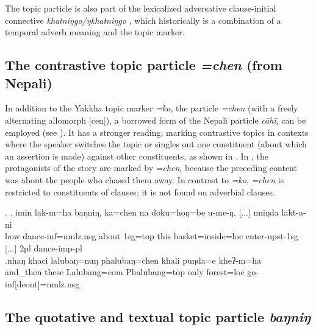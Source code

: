 The topic particle is also part of the lexicalized adversative clause-initial connective \emph{khatniŋgo/ŋkhatniŋgo} , which historically is a combination of a temporal adverb meaning  and the topic marker.

\subsection{The contrastive topic particle \emph{=chen} (from Nepali)}

In addition to the Yakkha topic marker \emph{=ko}, the particle \emph{=chen} (with a freely alternating allomorph  [cen]), a borrowed form of  the Nepali particle \emph{cāhĩ}, can be employed (see ).  It has a stronger reading, marking contrastive topics  in contexts where the speaker switches the topic or singles out one constituent (about which an assertion is made) against other constituents, as shown in \Next[a]. In \Next[b], the protagonists of the story are marked by \emph{=chen}, because the preceding content was about the people who chased them away.
In contrast to \emph{=ko},  \emph{=chen} is restricted to constituents of clauses; it is not found on adverbial clauses. 

\ex. \ag. imin lak-m=ha baŋniŋ, ka=chen  na doku=hoŋ=be        u-me-ŋ, [...] nniŋda lakt-a-ni\\
how dance{\sc -inf=nmlz.nsg} about {\sc 1sg=top} this basket{\sc =inside=loc} enter{\sc -npst-1sg} [...] {\sc 2pl} dance{\sc -imp-pl}\\
\bg.nhaŋ khaci     lalubaŋ=nuŋ   phalubaŋ=chen khali puŋda=e     kheʔ-m=ha\\
and\_then these Lalubang{\sc =com} Phalubang{\sc =top} only forest{\sc =loc} go{\sc -inf[deont]=nmlz.nsg}\\
 
\subsection{The quotative and textual topic particle \emph{baŋniŋ}}
	

